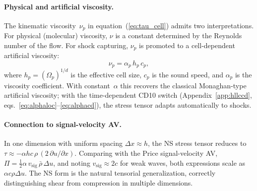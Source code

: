 \documentclass[twocolumn]{aastex63}
\newcommand{\vel}{{u}}
\begin{document}
\paragraph{Physical and artificial viscosity.}
The kinematic viscosity~$\nu_p$ in
equation~(\ref{eq:tau_cell}) admits two interpretations.
For physical (molecular) viscosity, $\nu$ is a constant
determined by the Reynolds number of the flow.
For shock capturing, $\nu_p$ is promoted to a
cell-dependent artificial viscosity:
\begin{equation}\label{eq:nu_av}
  \nu_p = \alpha_p\,h_p\,c_p,
\end{equation}
where $h_p = (\Omega_p)^{1/d}$ is the effective cell size,
$c_p$ is the sound speed, and $\alpha_p$ is the viscosity
coefficient.
With constant~$\alpha$ this recovers the classical
Monaghan-type artificial viscosity;
with the time-dependent CD10 switch
(Appendix~\ref{app:hllccd}, eqs.~\ref{eq:alphaloc}--\ref{eq:alphacd}),
the stress tensor adapts automatically to shocks.

\paragraph{Connection to signal-velocity AV.}
In one dimension with uniform spacing
$\Delta x \approx h$, the NS stress tensor reduces to
$\tau \approx -\alpha h c\,\rho\,(2\,\partial\vel/\partial x)$.
Comparing with the Price signal-velocity AV,
$\Pi = \tfrac{1}{2}\alpha\,v_\mathrm{sig}\,
  \bar\rho\,\Delta\vel$,
and noting $v_\mathrm{sig} \approx 2c$ for weak waves,
both expressions scale as $\alpha c\rho\Delta\vel$.
The NS form is the natural tensorial generalization,
correctly distinguishing shear from compression in
multiple dimensions.
\end{document}
